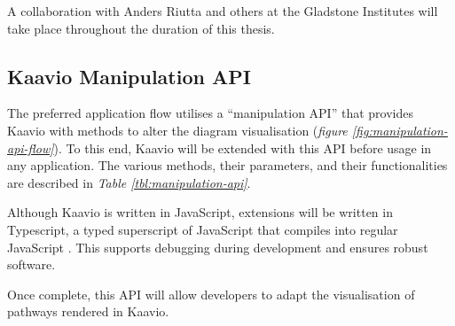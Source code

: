 \documentclass[a4paper,12pt,twoside]{apa}
\begin{document}
A collaboration with Anders Riutta and others at the Gladstone Institutes will take place throughout the duration of this thesis.

\FloatBarrier
\subsection{Kaavio Manipulation API}
The preferred application flow utilises a ``manipulation API'' that provides Kaavio with methods to alter the diagram visualisation (\textit{figure \ref{fig:manipulation-api-flow}}). To this end, Kaavio will be extended with this API before usage in any application. The various methods, their parameters, and their functionalities are described in \textit{Table \ref{tbl:manipulation-api}}.

Although Kaavio is written in JavaScript, extensions will be written in Typescript, a typed superscript of JavaScript that compiles into regular JavaScript \cite{Typescript}. This supports debugging during development and ensures robust software.

Once complete, this API will allow developers to adapt the visualisation of pathways rendered in Kaavio.
\end{document}
